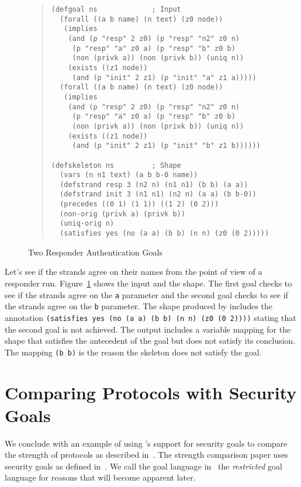 \documentclass[12pt]{article}
\begin{document}
\begin{figure}
\begin{quote}
\begin{verbatim}
(defgoal ns             ; Input
  (forall ((a b name) (n text) (z0 node))
   (implies
    (and (p "resp" 2 z0) (p "resp" "n2" z0 n)
     (p "resp" "a" z0 a) (p "resp" "b" z0 b)
     (non (privk a)) (non (privk b)) (uniq n))
    (exists ((z1 node))
     (and (p "init" 2 z1) (p "init" "a" z1 a)))))
  (forall ((a b name) (n text) (z0 node))
   (implies
    (and (p "resp" 2 z0) (p "resp" "n2" z0 n)
     (p "resp" "a" z0 a) (p "resp" "b" z0 b)
     (non (privk a)) (non (privk b)) (uniq n))
    (exists ((z1 node))
     (and (p "init" 2 z1) (p "init" "b" z1 b))))))

(defskeleton ns         ; Shape
  (vars (n n1 text) (a b b-0 name))
  (defstrand resp 3 (n2 n) (n1 n1) (b b) (a a))
  (defstrand init 3 (n1 n1) (n2 n) (a a) (b b-0))
  (precedes ((0 1) (1 1)) ((1 2) (0 2)))
  (non-orig (privk a) (privk b))
  (uniq-orig n)
  (satisfies yes (no (a a) (b b) (n n) (z0 (0 2)))))
\end{verbatim}
\end{quote}
\caption{Two Responder Authentication Goals}\label{fig:ns resp goals}
\end{figure}

Let's see if the strands agree on their names from the point of view
of a responder run.  Figure~\ref{fig:ns resp goals} shows the input
and the shape.  The first goal checks to see if the strands agree on
the \texttt{a} parameter and the second goal checks to see if the
strands agree on the \texttt{b} parameter.  The shape produced by
{\cpsa} includes the annotation \texttt{(satisfies yes (no (a a) (b b)
  (n n) (z0 (0 2))))} stating that the second goal is not achieved.
The output includes a variable mapping for the shape that
satisfies the antecedent of the goal but does not satisfy its
conclusion.  The mapping \texttt{(b b)} is the reason the skeleton
does not satisfy the goal.

\section{Comparing Protocols with Security Goals}\label{sec:comparing}

We conclude with an example of using {\cpsa}'s support for security
goals to compare the strength of protocols as described
in~\cite{GuttmanLiskovRowe14}.  The strength comparison paper uses
security goals as defined in~\cite{Guttman14}.  We call the goal
language in~\cite{Guttman14} the \emph{restricted} goal language for
reasons that will become apparent later.
\end{document}

